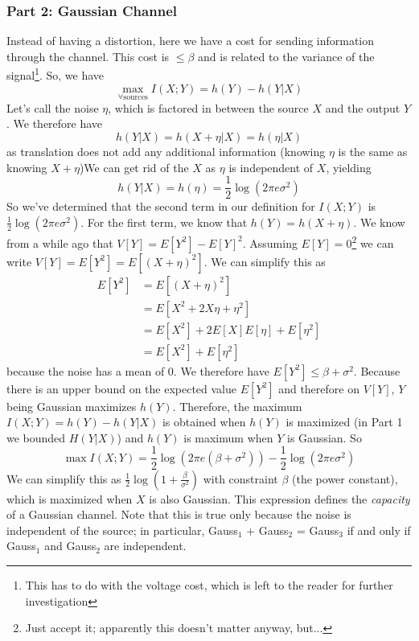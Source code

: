 \documentclass[11pt]{article}
\theoremstyle{definition}
\begin{document}
\subsubsection{Part 2: Gaussian Channel}

Instead of having a distortion, here we have a cost for sending information through the channel. This cost is $\leq \beta$ and is related to the variance of the signal\footnote{This has to do with the voltage cost, which is left to the reader for further investigation}. So, we have $$\max_{\forall \text{sources}} I(X;Y) = h(Y) - h(Y|X)$$Let's call the noise $\eta$, which is factored in between the source $X$ and the output $Y$. We therefore have $$h(Y|X) = h(X+\eta | X) = h(\eta | X)$$as translation does not add any additional information (knowing $\eta$ is the same as knowing $X + \eta$)We can get rid of the $X$ as $\eta$ is independent of $X$, yielding $$h(Y|X) = h(\eta) = \frac{1}{2}\log(2\pi e \sigma^2)$$So we've determined that the second term in our definition for $I(X;Y)$ is $\frac{1}{2} \log (2 \pi e \sigma^2)$. For the first term, we know that $h(Y) = h(X+\eta)$. We know from a while ago that $V[Y] = E[Y^2] - E[Y]^2$. Assuming $E[Y] = 0$\footnote{Just accept it; apparently this doesn't matter anyway, but...} we can write $V[Y] = E[Y^2] = E[(X + \eta)^2]$. We can simplify this as \begin{align*}
E[Y^2] &= E[(X + \eta)^2] \\
	&= E[X^2 + 2X\eta + \eta^2] \\
	&= E[X^2] + 2E[X]E[\eta] + E[\eta^2] \\
	&= E[X^2] + E[\eta^2]
\end{align*}
because the noise has a mean of 0. We therefore have $E[Y^2] \leq \beta + \sigma^2$. Because there is an upper bound on the expected value $E[Y^2]$ and therefore on $V[Y]$, $Y$ being Gaussian maximizes $h(Y)$. Therefore, the maximum $I(X;Y) = h(Y) - h(Y|X)$ is obtained when $h(Y)$ is maximized (in Part 1 we bounded $H(Y|X)$) and $h(Y)$ is maximum when $Y$ is Gaussian. So $$\max I(X;Y) = \frac{1}{2}\log(2\pi e (\beta + \sigma^2)) - \frac{1}{2} \log (2 \pi e \sigma^2)$$We can simplify this as $\frac{1}{2} \log (1 + \frac{\beta}{\sigma^2})$ with constraint $\beta$ (the power constant), which is maximized when $X$ is also Gaussian. This expression defines the \textit{capacity} of a Gaussian channel. Note that this is true only because the noise is independent of the source; in particular, Gauss$_1$ + Gauss$_2$ = Gauss$_3$ if and only if Gauss$_1$ and Gauss$_2$ are independent. 
\end{document}
